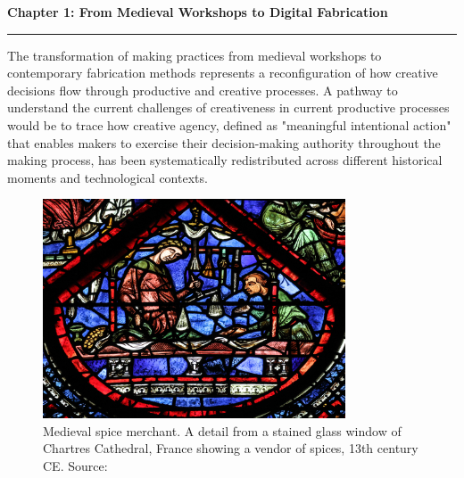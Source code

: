 \setcounter{chapter}{1}
\setcounter{section}{0}


\pagestyle{fancy}
\fancyhf{} %
\fancyfoot[C]{\thepage} 
\renewcommand{\headrulewidth}{0pt}
\renewcommand{\footrulewidth}{0pt}

\noindent
{\Large\textbf{Chapter 1: From Medieval Workshops to Digital Fabrication}}
\vspace{0.3cm}
\hrule
\vspace{0.8cm}
\label{ch:introduction}

\setlength{\parindent}{0pt}

The transformation of making practices from medieval workshops to contemporary fabrication methods represents a reconfiguration of how creative decisions flow through productive and creative processes. A pathway to understand the current challenges of creativeness in current productive processes would be to trace how creative agency, defined as "meaningful intentional action" \citep{niedderer2024} that enables makers to exercise their decision-making authority throughout the making process, has been systematically redistributed across different historical moments and technological contexts.

\begin{figure}[H]
\centering
\includegraphics[width=0.8\textwidth]{figures/chapter1/medieval guilds.jpg}
\caption{Medieval spice merchant. A detail from a stained glass window of Chartres Cathedral, France showing a vendor of spices, 13th century CE. Source: \citet{lawrenceop2018}}
\label{fig:medieval_spice_merchant}
\end{figure}


